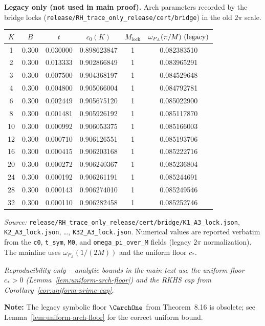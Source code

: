 \begin{center}
  \textbf{Legacy only (not used in main proof).} Arch parameters recorded by the bridge locks
  (\texttt{release/RH\_trace\_only\_release/cert/bridge}) in the old $2\pi$ scale.
\end{center}
\begin{center}
  \begin{tabular}{cccccc}
    \toprule
    $K$ & $B$ & $t$ & $c_0(K)$ & $M_{\mathrm{lock}}$ & $\omega_{P_A}(\pi/M)\ \text{(legacy)}$ \\
    \midrule
    1  & 0.300 & 0.030000 & 0.898623847 & 1 & 0.082383510 \\
    2  & 0.300 & 0.013333 & 0.902866849 & 1 & 0.083965291 \\
    3  & 0.300 & 0.007500 & 0.904368197 & 1 & 0.084529648 \\
    4  & 0.300 & 0.004800 & 0.905066004 & 1 & 0.084792781 \\
    6  & 0.300 & 0.002449 & 0.905675120 & 1 & 0.085022900 \\
    8  & 0.300 & 0.001481 & 0.905926192 & 1 & 0.085117870 \\
    10 & 0.300 & 0.000992 & 0.906053375 & 1 & 0.085166003 \\
    12 & 0.300 & 0.000710 & 0.906126551 & 1 & 0.085193706 \\
    16 & 0.300 & 0.000415 & 0.906203168 & 1 & 0.085222716 \\
    20 & 0.300 & 0.000272 & 0.906240367 & 1 & 0.085236804 \\
    24 & 0.300 & 0.000192 & 0.906261191 & 1 & 0.085244691 \\
    28 & 0.300 & 0.000143 & 0.906274010 & 1 & 0.085249546 \\
    32 & 0.300 & 0.000110 & 0.906282458 & 1 & 0.085252746 \\
    \bottomrule
  \end{tabular}
\end{center}
\par\smallskip
\noindent\emph{Source:} \texttt{release/RH\_trace\_only\_release/cert/bridge/K1\_A3\_lock.json}, \texttt{K2\_A3\_lock.json}, …, \texttt{K32\_A3\_lock.json}. Numerical values are reported verbatim from the \texttt{c0}, \texttt{t\_sym}, \texttt{M0}, and \texttt{omega\_pi\_over\_M} fields (legacy $2\pi$ normalization). The mainline uses $\omega_{P_A}(1/(2M))$ and the uniform floor $c_*$.
\begin{center}
  \footnotesize\itshape Reproducibility only – analytic bounds in the main text use the uniform floor $c_*>0$ (Lemma~\ref{lem:uniform-arch-floor}) and the RKHS cap from Corollary~\ref{cor:uniform-prime-cap}.

  \textbf{Note:} The legacy symbolic floor $\CarchOne$ from Theorem~8.16 is obsolete; see Lemma~\ref{lem:uniform-arch-floor} for the correct uniform bound.
\end{center}
